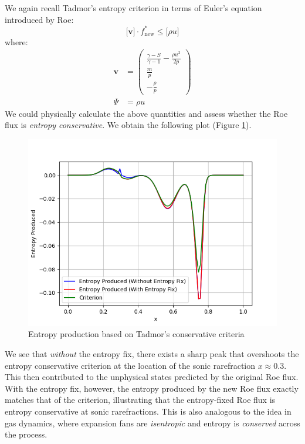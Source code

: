 \documentclass[a4paper]{article}
\numberwithin{equation}{section}
\begin{document}
We again recall Tadmor's entropy criterion in terms of Euler's equation introduced by Roe:
\begin{equation} \label{eq:TadmorCriterion}
    \big[\mathbf{v}\big] \cdot f^*_{\text{new}} \leq \big[\rho u\big]
\end{equation}
where:
\begin{equation}
    \begin{split}
        \mathbf{v} &= 
        \begin{pmatrix}
            \frac{\gamma - S}{\gamma - 1}-\frac{\rho u^2}{2p} \\
            \frac{m}{p}\\
            -\frac{\rho}{p}
        \end{pmatrix}\\
        \Psi &= \rho u
    \end{split}
\end{equation} 
We could physically calculate the above quantities and assess whether the Roe flux is \textit{entropy conservative}. We obtain the following plot (Figure \ref{fig:TadmorResults}).
\begin{figure}[H]
    \centering
    \includegraphics[width=13cm]{fig/Tadmor_Criterion.png}
    \caption{Entropy production based on Tadmor's conservative criteria}
    \label{fig:TadmorResults}
\end{figure}
We see that \textit{without} the entropy fix, there exists a sharp peak that overshoots the entropy conservative criterion at the location of the sonic rarefraction $x \approx 0.3$. This then contributed to the unphysical states predicted by the original Roe flux. With the entropy fix, however, the entropy produced by the new Roe flux exactly matches that of the criterion, illustrating that the entropy-fixed Roe flux is entropy conservative at sonic rarefractions. This is also analogous to the idea in gas dynamics, where expansion fans are \textit{isentropic} and entropy is \textit{conserved} across the process. 
\end{document}

